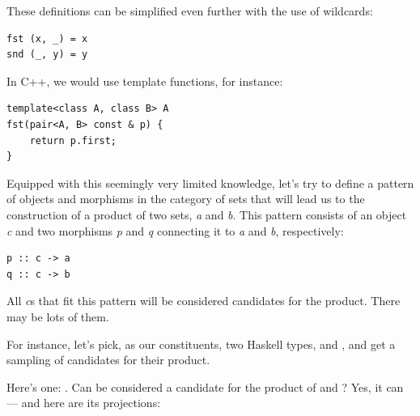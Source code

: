 These definitions can be simplified even further with the use of
wildcards:

\begin{verbatim}
fst (x, _) = x
snd (_, y) = y
\end{verbatim}
In C++, we would use template functions, for instance:

\begin{verbatim}
template<class A, class B> A
fst(pair<A, B> const & p) {
    return p.first;
}
\end{verbatim}
Equipped with this seemingly very limited knowledge, let's try to define
a pattern of objects and morphisms in the category of sets that will
lead us to the construction of a product of two sets, \emph{a} and
\emph{b}. This pattern consists of an object \emph{c} and two morphisms
\emph{p} and \emph{q} connecting it to \emph{a} and \emph{b},
respectively:

\begin{verbatim}
p :: c -> a
q :: c -> b
\end{verbatim}

\begin{figure}[H]
\centering
{}
\end{figure}

\noindent
All \emph{c}s that fit this pattern will be considered candidates for
the product. There may be lots of them.

\begin{figure}[H]
\centering
{}
\end{figure}

\noindent
For instance, let's pick, as our constituents, two Haskell types,
 and , and get a sampling of candidates for
their product.

Here's one: . Can  be considered a candidate for
the product of  and ? Yes, it can --- and here
are its projections:

